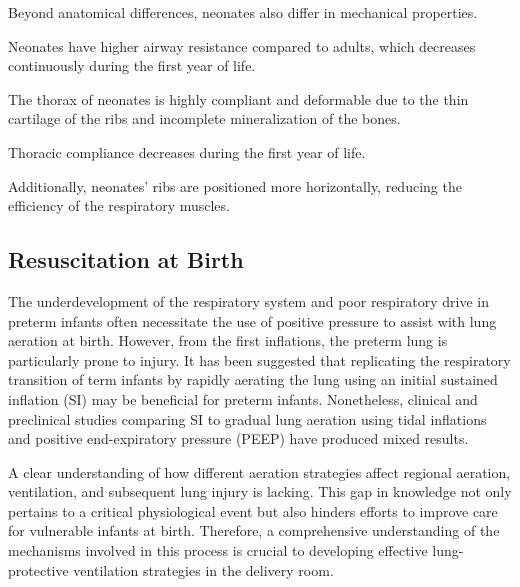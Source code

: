Beyond anatomical differences, neonates also differ in mechanical
properties.

Neonates have higher airway resistance compared to adults, which
decreases continuously during the first year of life.

The thorax of neonates is highly compliant and deformable due to the
thin cartilage of the ribs and incomplete mineralization of the bones.

Thoracic compliance decreases during the first year of life.

Additionally, neonates' ribs are positioned more horizontally,
reducing the efficiency of the respiratory muscles.

\subsection{Resuscitation at Birth}
\label{subsec:resuscitation_at_birth}

The underdevelopment of the respiratory system and poor respiratory
drive in preterm infants often necessitate the use of positive
pressure to assist with lung aeration at birth. However, from the
first inflations, the preterm lung is particularly prone to injury. It
has been suggested that replicating the respiratory transition of term
infants by rapidly aerating the lung using an initial sustained
inflation (SI) may be beneficial for preterm infants. Nonetheless,
clinical and preclinical studies comparing SI to gradual lung aeration
using tidal inflations and positive end-expiratory pressure (PEEP)
have produced mixed results\cite{tingay2019}.

A clear understanding of how different aeration strategies affect
regional aeration, ventilation, and subsequent lung injury is
lacking. This gap in knowledge not only pertains to a critical
physiological event but also hinders efforts to improve care for
vulnerable infants at birth. Therefore, a comprehensive understanding
of the mechanisms involved in this process is crucial to developing
effective lung-protective ventilation strategies in the delivery
room\cite{veneroni2020}.

